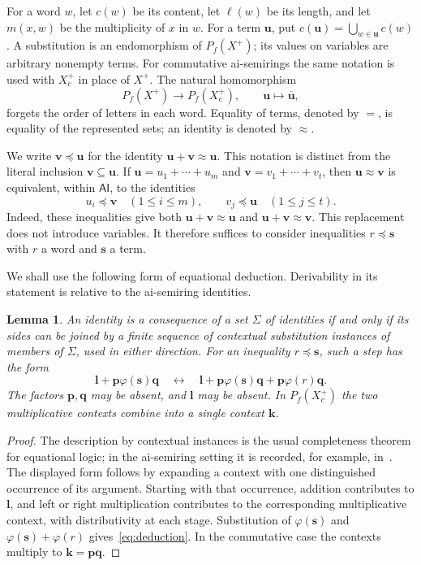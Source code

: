 \documentclass[11pt,reqno]{amsart}
\newtheorem{lemma}[theorem]{Lemma}
\theoremstyle{remark}
\newcommand{\AI}{\mathsf{AI}}
\newcommand{\bu}{\mathbf u}
\newcommand{\bv}{\mathbf v}
\newcommand{\bs}{\mathbf s}
\newcommand{\bK}{\mathbf k}
\numberwithin{equation}{section}
\begin{document}
For a word $w$, let $c(w)$ be its content, let $\ell(w)$ be its length,
and let $m(x,w)$ be the multiplicity of $x$ in $w$. For a term $\bu$, put
$c(\bu)=\bigcup_{w\in\bu}c(w)$. A substitution is an endomorphism of
$P_f(X^+)$; its values on variables are arbitrary nonempty terms. For
commutative ai-semirings the same notation is used with $X_c^+$ in place
of $X^+$. The natural homomorphism
\[
P_f(X^+)\longrightarrow P_f(X_c^+),\qquad \bu\longmapsto\overline{\bu},
\]
forgets the order of letters in each word. Equality of terms, denoted by
$=$, is equality of the represented sets; an identity is denoted by
$\approx$.

We write $\bv\preceq\bu$ for the identity $\bu+\bv\approx\bu$.
This notation is distinct from the literal inclusion $\bv\subseteq\bu$.
If $\bu=u_1+\cdots+u_m$ and $\bv=v_1+\cdots+v_t$, then
$\bu\approx\bv$ is equivalent, within $\AI$, to the identities
\[
u_i\preceq\bv\quad(1\leq i\leq m),\qquad
v_j\preceq\bu\quad(1\leq j\leq t).
\]
Indeed, these inequalities give both $\bu+\bv\approx\bu$ and
$\bu+\bv\approx\bv$. This replacement does not introduce variables.
It therefore suffices to consider inequalities $r\preceq\bs$ with $r$ a
word and $\bs$ a term.

We shall use the following form of equational deduction. Derivability in
its statement is relative to the ai-semiring identities.

\begin{lemma}\label{lem:deduction}
An identity is a consequence of a set $\Sigma$ of identities if and only if
its sides can be joined by a finite sequence of contextual substitution
instances of members of $\Sigma$, used in either direction. For an
inequality $r\preceq\bs$, such a step has the form
\begin{equation}\label{eq:deduction}
\mathbf l+\mathbf p\varphi(\bs)\mathbf q
\quad\longleftrightarrow\quad
\mathbf l+\mathbf p\varphi(\bs)\mathbf q+
\mathbf p\varphi(r)\mathbf q.
\end{equation}
The factors $\mathbf p,\mathbf q$ may be absent, and $\mathbf l$ may be
absent. In $P_f(X_c^+)$ the two multiplicative contexts combine into a
single context $\bK$.
\end{lemma}
\begin{proof}
The description by contextual instances is the usual completeness theorem
for equational logic; in the ai-semiring setting it is recorded, for
example, in~\cite[Lemma~1.1]{RLLC}. The displayed form follows by expanding
a context with one distinguished occurrence of its argument. Starting
with that occurrence, addition contributes to $\mathbf l$, and left or
right multiplication contributes to the corresponding multiplicative
context, with distributivity at each stage. Substitution of $\varphi(\bs)$
and $\varphi(\bs)+\varphi(r)$ gives~\eqref{eq:deduction}. In the
commutative case the contexts multiply to $\bK=\mathbf p\mathbf q$.
\end{proof}
\end{document}
